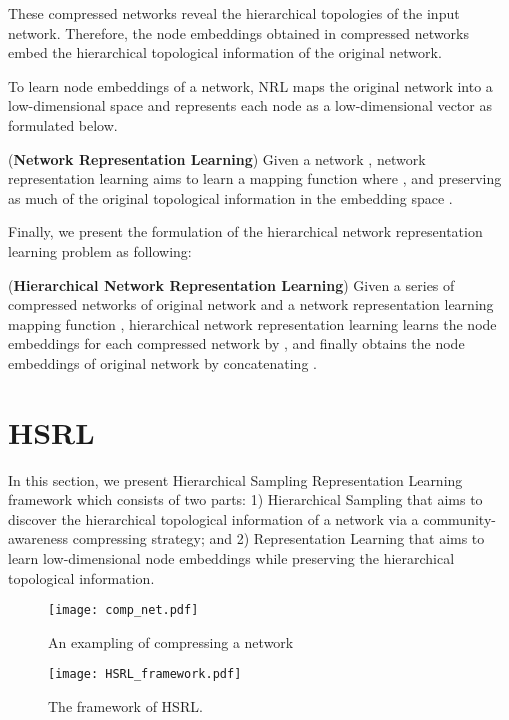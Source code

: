 \documentclass[conference]{IEEEtran}
\begin{document}
These compressed networks reveal the hierarchical topologies of the input network. Therefore, the node embeddings obtained in compressed networks embed the hierarchical topological information of the original network. 

To learn node embeddings of a network, NRL maps the original network into a low-dimensional space and represents each node as a low-dimensional vector as formulated below.
\begin{mydef}
	(\textbf{Network Representation Learning}) \cite{goyal2018graph} Given a network , network representation learning aims to learn a mapping function  where , and preserving as much of the original topological information in the embedding space .
\end{mydef}

Finally, we present the formulation of the hierarchical network representation learning problem as following:
\begin{mydef}
	(\textbf{Hierarchical Network Representation Learning}) Given a series of compressed networks  of original network  and a network representation learning mapping function , hierarchical network representation learning learns the node embeddings for each compressed network by , and finally obtains the node embeddings  of original network  by concatenating .
\end{mydef}


\section{HSRL}
In this section, we present Hierarchical Sampling Representation Learning framework which consists of two parts: 1) Hierarchical Sampling that aims to discover the hierarchical topological information of a network via a community-awareness compressing strategy; and 2) Representation Learning that aims to learn low-dimensional node embeddings while preserving the hierarchical topological information. 

\begin{figure}
    \centering
    \texttt{[image: comp\_net.pdf]}
    \caption{An exampling of compressing a network}
    \label{figure2}
\end{figure}

\begin{figure*}
\centering
	\texttt{[image: HSRL\_framework.pdf]}
	\caption{{\small The framework of HSRL.}}\label{figure3}
\end{figure*}
\end{document}
